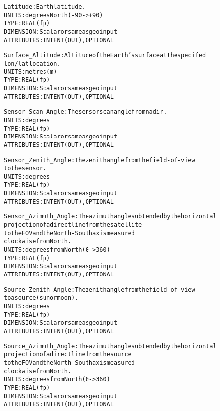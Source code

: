 \begin{alltt}
        Latitude:             Earth latitude.
                              UNITS:      degrees North (-90->+90)
                              TYPE:       REAL(fp)
                              DIMENSION:  Scalar or same as geo input
                              ATTRIBUTES: INTENT(OUT), OPTIONAL
 
        Surface_Altitude:     Altitude of the Earth's surface at the specifed
                              lon/lat location.
                              UNITS:      metres (m)
                              TYPE:       REAL(fp)
                              DIMENSION:  Scalar or same as geo input
                              ATTRIBUTES: INTENT(OUT), OPTIONAL
 
        Sensor_Scan_Angle:    The sensor scan angle from nadir.
                              UNITS:      degrees
                              TYPE:       REAL(fp)
                              DIMENSION:  Scalar or same as geo input
                              ATTRIBUTES: INTENT(OUT), OPTIONAL
 
        Sensor_Zenith_Angle:  The zenith angle from the field-of-view
                              to the sensor.
                              UNITS:      degrees
                              TYPE:       REAL(fp)
                              DIMENSION:  Scalar or same as geo input
                              ATTRIBUTES: INTENT(OUT), OPTIONAL
 
        Sensor_Azimuth_Angle: The azimuth angle subtended by the horizontal
                              projection of a direct line from the satellite
                              to the FOV and the North-South axis measured
                              clockwise from North.
                              UNITS:      degrees from North (0->360) 
                              TYPE:       REAL(fp)
                              DIMENSION:  Scalar or same as geo input
                              ATTRIBUTES: INTENT(OUT), OPTIONAL
 
        Source_Zenith_Angle:  The zenith angle from the field-of-view
                              to a source (sun or moon).
                              UNITS:      degrees
                              TYPE:       REAL(fp)
                              DIMENSION:  Scalar or same as geo input
                              ATTRIBUTES: INTENT(OUT), OPTIONAL
 
        Source_Azimuth_Angle: The azimuth angle subtended by the horizontal
                              projection of a direct line from the source
                              to the FOV and the North-South axis measured
                              clockwise from North.
                              UNITS:      degrees from North (0->360) 
                              TYPE:       REAL(fp)
                              DIMENSION:  Scalar or same as geo input
                              ATTRIBUTES: INTENT(OUT), OPTIONAL
 

\end{alltt}
